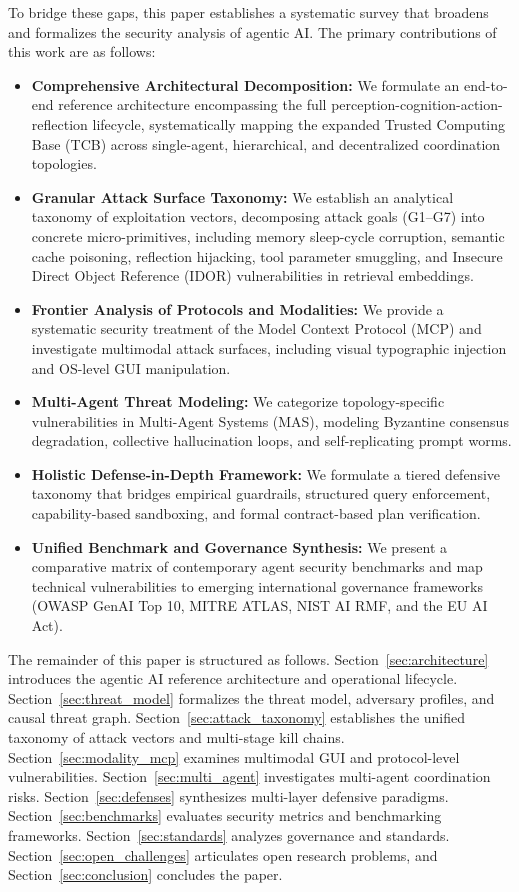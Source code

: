 To bridge these gaps, this paper establishes a systematic survey that broadens and formalizes the security analysis of agentic AI. The primary contributions of this work are as follows:
\begin{itemize}
    \item \textbf{Comprehensive Architectural Decomposition:} We formulate an end-to-end reference architecture encompassing the full perception-cognition-action-reflection lifecycle, systematically mapping the expanded Trusted Computing Base (TCB) across single-agent, hierarchical, and decentralized coordination topologies.
    \item \textbf{Granular Attack Surface Taxonomy:} We establish an analytical taxonomy of exploitation vectors, decomposing attack goals (G1--G7) into concrete micro-primitives, including memory sleep-cycle corruption, semantic cache poisoning, reflection hijacking, tool parameter smuggling, and Insecure Direct Object Reference (IDOR) vulnerabilities in retrieval embeddings.
    \item \textbf{Frontier Analysis of Protocols and Modalities:} We provide a systematic security treatment of the Model Context Protocol (MCP) and investigate multimodal attack surfaces, including visual typographic injection and OS-level GUI manipulation.
    \item \textbf{Multi-Agent Threat Modeling:} We categorize topology-specific vulnerabilities in Multi-Agent Systems (MAS), modeling Byzantine consensus degradation, collective hallucination loops, and self-replicating prompt worms.
    \item \textbf{Holistic Defense-in-Depth Framework:} We formulate a tiered defensive taxonomy that bridges empirical guardrails, structured query enforcement, capability-based sandboxing, and formal contract-based plan verification.
    \item \textbf{Unified Benchmark and Governance Synthesis:} We present a comparative matrix of contemporary agent security benchmarks and map technical vulnerabilities to emerging international governance frameworks (OWASP GenAI Top 10, MITRE ATLAS, NIST AI RMF, and the EU AI Act).
\end{itemize}

The remainder of this paper is structured as follows. Section~\ref{sec:architecture} introduces the agentic AI reference architecture and operational lifecycle. Section~\ref{sec:threat_model} formalizes the threat model, adversary profiles, and causal threat graph. Section~\ref{sec:attack_taxonomy} establishes the unified taxonomy of attack vectors and multi-stage kill chains. Section~\ref{sec:modality_mcp} examines multimodal GUI and protocol-level vulnerabilities. Section~\ref{sec:multi_agent} investigates multi-agent coordination risks. Section~\ref{sec:defenses} synthesizes multi-layer defensive paradigms. Section~\ref{sec:benchmarks} evaluates security metrics and benchmarking frameworks. Section~\ref{sec:standards} analyzes governance and standards. Section~\ref{sec:open_challenges} articulates open research problems, and Section~\ref{sec:conclusion} concludes the paper.
